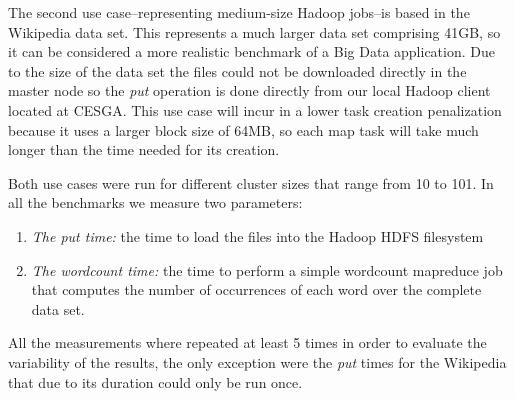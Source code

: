 The second use case--representing medium-size Hadoop jobs--is based in the Wikipedia\cite{wikipedia} data set. This represents a much larger data set comprising 41GB, so it can be considered a more realistic benchmark of a Big Data application. Due to the size of the data set the files could not be downloaded directly in the master node so the \emph{put} operation is done directly from our local Hadoop client located at CESGA. This use case will incur in a lower task creation penalization because it uses a larger block size of 64MB, so each map task will take much longer than the time needed for its creation.

 
Both use cases were run for different cluster sizes that range from 10 to 101. In all the benchmarks we measure two parameters:
\begin{enumerate}
\item \emph{The put time:} the time to load the files into the Hadoop HDFS filesystem 
\item \emph{The wordcount time:} the time to perform a simple wordcount mapreduce job that computes the number of occurrences of each word over the complete data set. 
\end{enumerate}
All the measurements where repeated at least 5 times in order to evaluate the variability of the results, the only exception were the \emph{put} times for the Wikipedia that due to its duration could only be run once.


